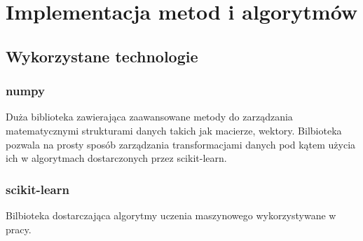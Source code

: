 \documentclass[eng,printmode]{mgr}
\begin{document}
\section{Implementacja metod i algorytmów}
\subsection{Wykorzystane technologie}
\subsubsection{numpy} 
Duża biblioteka zawierająca zaawansowane metody do zarządzania matematycznymi strukturami danych takich jak macierze, wektory. Bilbioteka pozwala na prosty sposób zarządzania transformacjami danych pod kątem użycia ich w algorytmach dostarczonych przez scikit-learn. \cite{numpy}
\subsubsection{scikit-learn} 
Bilbioteka dostarczająca algorytmy uczenia maszynowego wykorzystywane w pracy.  \cite{scikit-learn}
\end{document}
